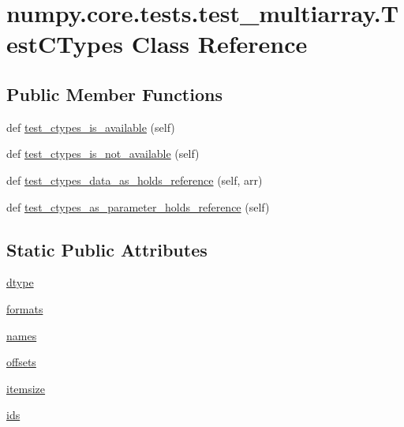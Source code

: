 \hypertarget{classnumpy_1_1core_1_1tests_1_1test__multiarray_1_1TestCTypes}{}\section{numpy.\+core.\+tests.\+test\+\_\+multiarray.\+Test\+C\+Types Class Reference}
\label{classnumpy_1_1core_1_1tests_1_1test__multiarray_1_1TestCTypes}
\subsection*{Public Member Functions}
\begin{DoxyCompactItemize}
\item 
def \hyperlink{classnumpy_1_1core_1_1tests_1_1test__multiarray_1_1TestCTypes_a1d3c0561cda01ebc3dae9dc538faeb62}{test\+\_\+ctypes\+\_\+is\+\_\+available} (self)
\item 
def \hyperlink{classnumpy_1_1core_1_1tests_1_1test__multiarray_1_1TestCTypes_afbff2a534acd74bfad2e43047512a621}{test\+\_\+ctypes\+\_\+is\+\_\+not\+\_\+available} (self)
\item 
def \hyperlink{classnumpy_1_1core_1_1tests_1_1test__multiarray_1_1TestCTypes_a585678b9408e66a5f11ec1049c883f8d}{test\+\_\+ctypes\+\_\+data\+\_\+as\+\_\+holds\+\_\+reference} (self, arr)
\item 
def \hyperlink{classnumpy_1_1core_1_1tests_1_1test__multiarray_1_1TestCTypes_a35e898ab2252c47886ef91552c1fcded}{test\+\_\+ctypes\+\_\+as\+\_\+parameter\+\_\+holds\+\_\+reference} (self)
\end{DoxyCompactItemize}
\subsection*{Static Public Attributes}
\begin{DoxyCompactItemize}
\item 
\hyperlink{classnumpy_1_1core_1_1tests_1_1test__multiarray_1_1TestCTypes_a504f1004e9a31b2ae5d60f4056e7b9fb}{dtype}
\item 
\hyperlink{classnumpy_1_1core_1_1tests_1_1test__multiarray_1_1TestCTypes_a36d4175751f851a7e4accd30d6c73591}{formats}
\item 
\hyperlink{classnumpy_1_1core_1_1tests_1_1test__multiarray_1_1TestCTypes_a38d2f55e685db0b90d2527035ef75c7e}{names}
\item 
\hyperlink{classnumpy_1_1core_1_1tests_1_1test__multiarray_1_1TestCTypes_ad371db8fc91fef1afa2111593bfc42d6}{offsets}
\item 
\hyperlink{classnumpy_1_1core_1_1tests_1_1test__multiarray_1_1TestCTypes_a6996d175ae286f7d55d79cfec8367c0c}{itemsize}
\item 
\hyperlink{classnumpy_1_1core_1_1tests_1_1test__multiarray_1_1TestCTypes_af92a87144f444b5fab35ac8d7f60742a}{ids}
\end{DoxyCompactItemize}


